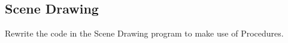\subsection{Scene Drawing} %
\label{sub:scene_drawing}

Rewrite the code in the Scene Drawing program to make use of Procedures.


